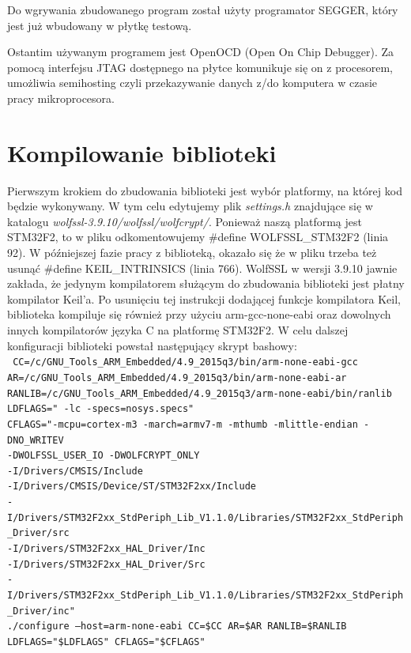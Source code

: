 \documentclass[oneside]{mgr}
\begin{document}
Do wgrywania zbudowanego program został użyty programator SEGGER, który jest już wbudowany w płytkę testową.

Ostantim używanym programem jest OpenOCD (Open On Chip Debugger). Za pomocą interfejsu JTAG dostępnego na płytce komunikuje się on z procesorem, umożliwia semihosting czyli przekazywanie danych z/do komputera w czasie pracy mikroprocesora.

\section{Kompilowanie biblioteki}

Pierwszym krokiem do zbudowania biblioteki jest wybór platformy, na której kod będzie wykonywany. W tym celu edytujemy plik \textit{settings.h} znajdujące się w katalogu \textit{wolfssl-3.9.10/wolfssl/wolfcrypt/}. Ponieważ naszą platformą jest STM32F2, to w pliku odkomentowujemy \#define WOLFSSL\_STM32F2 (linia 92). W późniejszej fazie pracy z biblioteką, okazało się że w pliku trzeba też usunąć \#define KEIL\_INTRINSICS (linia 766). WolfSSL w wersji 3.9.10 jawnie zakłada, że jedynym kompilatorem służącym do zbudowania biblioteki jest płatny kompilator Keil'a. Po usunięciu tej instrukcji dodającej funkcje kompilatora Keil, biblioteka kompiluje się również przy użyciu arm-gcc-none-eabi oraz dowolnych innych kompilatorów języka C na platformę STM32F2.
W celu dalszej konfiguracji biblioteki powstał następujący skrypt bashowy:\\
\texttt{
CC=/c/GNU\_Tools\_ARM\_Embedded/4.9\_2015q3/bin/arm-none-eabi-gcc\\
AR=/c/GNU\_Tools\_ARM\_Embedded/4.9\_2015q3/bin/arm-none-eabi-ar\\
RANLIB=/c/GNU\_Tools\_ARM\_Embedded/4.9\_2015q3/arm-none-eabi/bin/ranlib\\
LDFLAGS=" -lc -specs=nosys.specs"\\
CFLAGS="-mcpu=cortex-m3 -march=armv7-m -mthumb -mlittle-endian -DNO\_WRITEV \\-DWOLFSSL\_USER\_IO -DWOLFCRYPT\_ONLY\\-I/Drivers/CMSIS/Include\\-I/Drivers/CMSIS/Device/ST/STM32F2xx/Include\\-I/Drivers/STM32F2xx\_StdPeriph\_Lib\_V1.1.0/Libraries/STM32F2xx\_StdPeriph\_Driver/src\\-I/Drivers/STM32F2xx\_HAL\_Driver/Inc \\-I/Drivers/STM32F2xx\_HAL\_Driver/Src\\-I/Drivers/STM32F2xx\_StdPeriph\_Lib\_V1.1.0/Libraries/STM32F2xx\_StdPeriph\_Driver/inc"\\
./configure --host=arm-none-eabi CC=\$CC AR=\$AR RANLIB=\$RANLIB LDFLAGS="\$LDFLAGS" CFLAGS="\$CFLAGS"	
}
\end{document}
